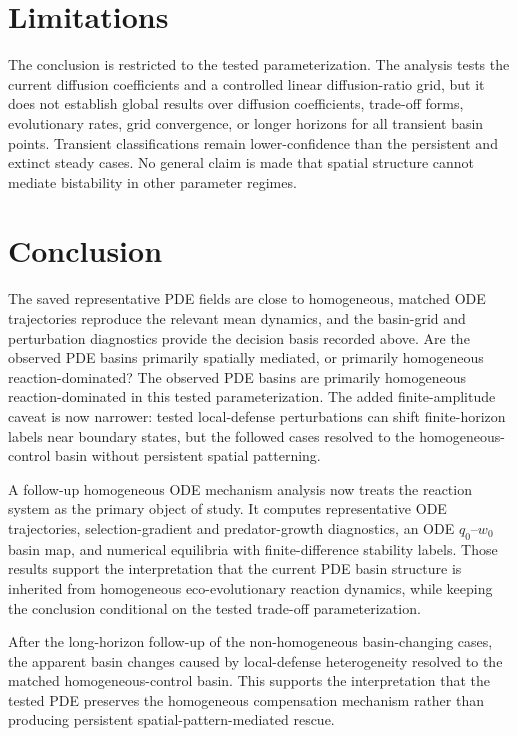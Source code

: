 \documentclass[11pt]{article}
\begin{document}
\section{Limitations}

The conclusion is restricted to the tested parameterization. The analysis tests the current diffusion coefficients and a controlled linear diffusion-ratio grid, but it does not establish global results over diffusion coefficients, trade-off forms, evolutionary rates, grid convergence, or longer horizons for all transient basin points. Transient classifications remain lower-confidence than the persistent and extinct steady cases. No general claim is made that spatial structure cannot mediate bistability in other parameter regimes.

\section{Conclusion}

The saved representative PDE fields are close to homogeneous, matched ODE trajectories reproduce the relevant mean dynamics, and the basin-grid and perturbation diagnostics provide the decision basis recorded above. Are the observed PDE basins primarily spatially mediated, or primarily homogeneous reaction-dominated? The observed PDE basins are primarily homogeneous reaction-dominated in this tested parameterization. The added finite-amplitude caveat is now narrower: tested local-defense perturbations can shift finite-horizon labels near boundary states, but the followed cases resolved to the homogeneous-control basin without persistent spatial patterning.

A follow-up homogeneous ODE mechanism analysis now treats the reaction system as the primary object of study. It computes representative ODE trajectories, selection-gradient and predator-growth diagnostics, an ODE \(q_0\)--\(w_0\) basin map, and numerical equilibria with finite-difference stability labels. Those results support the interpretation that the current PDE basin structure is inherited from homogeneous eco-evolutionary reaction dynamics, while keeping the conclusion conditional on the tested trade-off parameterization.

After the long-horizon follow-up of the non-homogeneous basin-changing cases, the apparent basin changes caused by local-defense heterogeneity resolved to the matched homogeneous-control basin. This supports the interpretation that the tested PDE preserves the homogeneous compensation mechanism rather than producing persistent spatial-pattern-mediated rescue.
\end{document}
